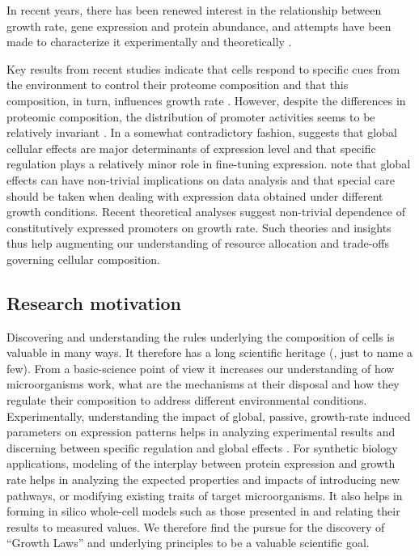 \documentclass[a4page,notitlepage]{article}
\begin{document}
In recent years, there has been renewed interest in the relationship between growth rate, gene expression and protein abundance, and attempts have been made to characterize it experimentally \parencite{Zaslaver2009a, Levy2009, Berthoumieux2013} and theoretically \parencite{Klumpp2009a, Scott2010b}.

Key results from recent studies indicate that cells respond to specific cues from the environment to control their proteome composition and that this composition, in turn, influences growth rate \parencite{Levy2009}.
However, despite the differences in proteomic composition, the distribution of promoter activities seems to be relatively invariant \parencite{Zaslaver2009a}.
In a somewhat contradictory fashion, \parencite{Berthoumieux2013} suggests that global cellular effects are major determinants of expression level and that specific regulation plays a relatively minor role in fine-tuning expression.
\parencite{loven2012} note that global effects can have non-trivial implications on data analysis and that special care should be taken when dealing with expression data obtained under different growth conditions.
Recent theoretical analyses \parencite{Klumpp2009a,Scott2010b} suggest non-trivial dependence of constitutively expressed promoters on growth rate.
Such theories and insights thus help augmenting our understanding of resource allocation and trade-offs governing cellular composition.

\subsection{Research motivation}
Discovering and understanding the rules underlying the composition of cells is valuable in many ways.
It therefore has a long scientific heritage (\cite{Schaechter1958, Maaloe1969, Bremer1987, Klumpp2009a}, just to name a few).
From a basic-science point of view it increases our understanding of how microorganisms work, what are the mechanisms at their disposal and how they regulate their composition to address different environmental conditions.
Experimentally, understanding the impact of global, passive, growth-rate induced parameters on expression patterns helps in analyzing experimental results and discerning between specific regulation and global effects \parencite{loven2012}.
For synthetic biology applications, modeling of the interplay between protein expression and growth rate helps in analyzing the expected properties and impacts of introducing new pathways, or modifying existing traits of target microorganisms.
It also helps in forming in silico whole-cell models such as those presented in \parencite{Lerman2012,Karr2012} and relating their results to measured values.
We therefore find the pursue for the discovery of ``Growth Laws'' \parencite{Scott2010b} and underlying principles to be a valuable scientific goal.
\end{document}
